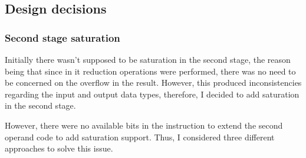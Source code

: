 \subsection{Design decisions}
\subsubsection{Second stage saturation} \label{satdiscus}
Initially there wasn't supposed to be saturation in the second stage,
the reason being that since in it reduction operations were performed,
there was no need to be concerned on the overflow in the result. However,
this produced inconsistencies regarding the input and output data types,
therefore, I decided to add saturation in the second stage.

\medbreak
However, there were no available bits in the instruction to extend the 
second operand code to add saturation support. Thus, I considered three
different approaches to solve this issue. 

